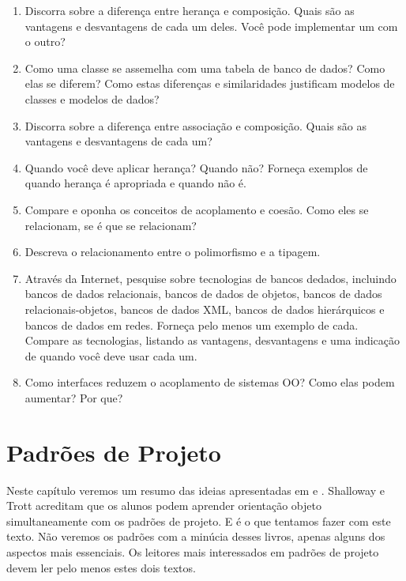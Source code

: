 \documentclass[
	11pt,				%
	openright,
	twoside,			%
	a4paper,			%
	english,			%
	french,
	brazil,				%
	sumario=tradicional
	]{abntex2}
\begin{document}
\begin{enumerate}
\item Discorra sobre a diferença entre herança e composição. Quais são as vantagens e desvantagens de cada um deles. Você pode implementar um com o outro?

\item Como uma classe se assemelha com uma tabela de banco de dados? Como elas se diferem? Como estas diferenças e similaridades justificam modelos de classes e modelos de dados?

\item Discorra sobre a diferença entre associação e composição. Quais são as vantagens e desvantagens de cada um?

\item Quando você deve aplicar herança? Quando não? Forneça exemplos de quando herança é apropriada e quando não é.

\item Compare e oponha os conceitos de acoplamento e coesão. Como eles se relacionam, se é que se relacionam?

\item Descreva o relacionamento entre o polimorfismo e a tipagem.

\item Através da Internet, pesquise sobre tecnologias de bancos dedados, incluindo bancos de dados relacionais, bancos de dados de objetos, bancos de dados relacionais-objetos, bancos de dados XML, bancos de dados hierárquicos e bancos de dados em redes. Forneça pelo menos um exemplo de cada. Compare as tecnologias, listando as vantagens, desvantagens e uma indicação de quando você deve usar cada um.

\item Como interfaces reduzem o acoplamento de sistemas OO? Como elas podem aumentar? Por que?
\end{enumerate}

\chapter{Padrões de Projeto}

Neste capítulo veremos um resumo das ideias apresentadas em  e . Shalloway e Trott acreditam que os alunos podem aprender orientação objeto simultaneamente com os padrões de projeto. E é o que tentamos fazer com este texto. Não veremos os padrões com a minúcia desses livros, apenas alguns dos aspectos mais essenciais. Os leitores mais interessados em padrões de projeto devem ler pelo menos estes dois textos.
\end{document}
